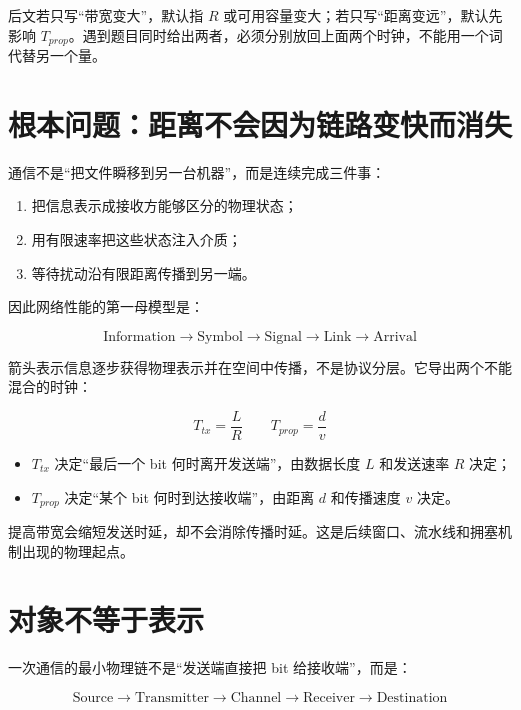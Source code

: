 \documentclass[UTF8,fontset=none,11pt,a4paper]{ctexart}
\providecommand{\tightlist}{\setlength{\itemsep}{0pt}\setlength{\parskip}{0pt}}
\begin{document}
后文若只写“带宽变大”，默认指 $R$ 或可用容量变大；若只写“距离变远”，默认先影响
$T_{prop}$。遇到题目同时给出两者，必须分别放回上面两个时钟，不能用一个词代替另一个量。

\section{根本问题：距离不会因为链路变快而消失}\label{1-ux6839ux672cux95eeux9898ux8dddux79bbux4e0dux4f1aux56e0ux4e3aux94feux8defux53d8ux5febux800cux6d88ux5931}

通信不是``把文件瞬移到另一台机器''，而是连续完成三件事：

\begin{enumerate}
\def\labelenumi{\arabic{enumi}.}
\tightlist
\item
  把信息表示成接收方能够区分的物理状态；
\item
  用有限速率把这些状态注入介质；
\item
  等待扰动沿有限距离传播到另一端。
\end{enumerate}

因此网络性能的第一母模型是：

\[
\boxed{
\text{Information}
\to \text{Symbol}
\to \text{Signal}
\to \text{Link}
\to \text{Arrival}
}
\]

箭头表示信息逐步获得物理表示并在空间中传播，不是协议分层。它导出两个不能混合的时钟：

\[
\boxed{T_{tx}=\frac{L}{R}}
\qquad
\boxed{T_{prop}=\frac{d}{v}}
\]

\begin{itemize}
\tightlist
\item
  \(T_{tx}\) 决定``最后一个 bit 何时离开发送端''，由数据长度 \(L\)
  和发送速率 \(R\) 决定；
\item
  \(T_{prop}\) 决定``某个 bit 何时到达接收端''，由距离 \(d\) 和传播速度
  \(v\) 决定。
\end{itemize}

提高带宽会缩短发送时延，却不会消除传播时延。这是后续窗口、流水线和拥塞机制出现的物理起点。

\section{对象不等于表示}\label{2-ux5bf9ux8c61ux4e0dux7b49ux4e8eux8868ux793a}

一次通信的最小物理链不是“发送端直接把 bit 给接收端”，而是：

\[
\boxed{
\text{Source}\to\text{Transmitter}\to\text{Channel}\to
\text{Receiver}\to\text{Destination}}
\]
\end{document}
